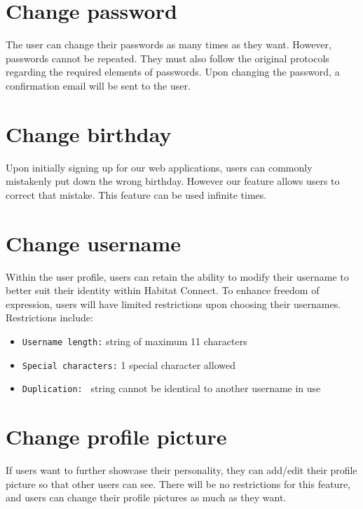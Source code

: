 \documentclass[conference]{IEEEtran}
\begin{document}
\section*{Change password}
The user can change their passwords as many times as they want. However, passwords cannot be repeated. They must also follow the original protocols regarding the required elements of passwords. Upon changing the password, a confirmation email will be sent to the user.

\section*{Change birthday}
Upon initially signing up for our web applications, users can commonly mistakenly put down the wrong birthday. However our feature allows users to correct that mistake. This feature can be used infinite times.

\section*{Change username}
Within the user profile, users can retain the ability to modify their username to better suit their  identity within Habitat Connect. To enhance freedom of expression, users will have limited restrictions upon choosing their usernames. Restrictions include:
\begin{itemize}
    \item \texttt{Username length:} string of maximum 11 characters
    \item \texttt{Special characters:} 1 special character allowed
    \item \texttt{Duplication: } string cannot be identical to another username in use
\end{itemize}

\section*{Change profile picture}
If users want to further showcase their personality, they can add/edit their profile picture so that other users can see. There will be no restrictions for this feature, and users can change their profile pictures as much as they want.
\end{document}
